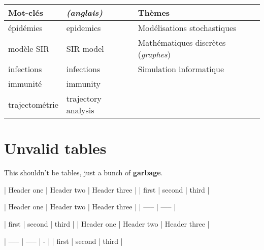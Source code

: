 \documentclass{article}
\begin{document}
\begin{tabular}{ |l | l | l| }
 Mot-clés        &  \textit{(anglais)}          &  Thèmes                              \\
\hline\hline

 épidémies       &  epidemics            &  Modélisations stochastiques         \\\hline

 modèle SIR      &  SIR model            &  Mathématiques discrètes (\textit{graphes}) \\\hline

 infections      &  infections           &  Simulation informatique             \\\hline

 immunité        &  immunity             &                                      \\\hline

 trajectométrie  &  trajectory analysis  &                                      \\\hline

\end{tabular}

\part{Unvalid tables}

This shouldn't be tables, just a bunch of \textbf{garbage}.


| Header one | Header two | Header three |
| first | second | third |


| Header one | Header two | Header three |
| ----- | ----- |


| first | second | third |
| Header one | Header two | Header three |

| ----- | ----- | - |
| first | second | third |
\end{document}
